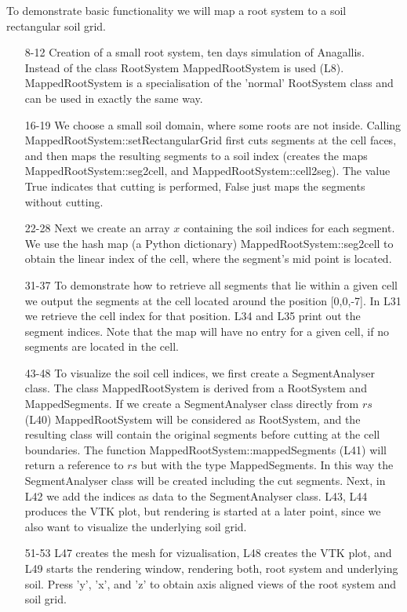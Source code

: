 To demonstrate basic functionality we will map a root system to a soil rectangular soil grid. 


\begin{itemize}

\item[8-12] Creation of a small root system, ten days simulation of Anagallis. Instead of the class RootSystem MappedRootSystem is used (L8). MappedRootSystem is a specialisation of the 'normal' RootSystem class and can be used in exactly the same way. 

\item[16-19] We choose a small soil domain, where some roots are not inside. Calling MappedRootSystem::setRectangularGrid first cuts segments at the cell faces, and then maps the resulting segments to a soil index (creates the maps MappedRootSystem::seg2cell, and MappedRootSystem::cell2seg). The value True indicates that cutting is performed, False just maps the segments without cutting. 

\item[22-28] Next we create an array $x$ containing the soil indices for each segment. We use the hash map (a Python dictionary) MappedRootSystem::seg2cell to obtain the linear index of the cell, where the segment's mid point is located.

\item[31-37] To demonstrate how to retrieve all segments that lie within a given cell we output the segments at the cell located around the position [0,0,-7]. In L31 we retrieve the cell index for that position. L34 and L35 print out the segment indices. Note that the map will have no entry for a given cell, if no segments are located in the cell. 

\item[43-48] To visualize the soil cell indices, we first create a SegmentAnalyser class. The class MappedRootSystem is derived from a RootSystem and MappedSegments. If we create a SegmentAnalyser class directly from $rs$ (L40) MappedRootSystem will be considered as RootSystem, and the resulting class will contain the original segments before cutting at the cell boundaries. The function MappedRootSystem::mappedSegments (L41) will return a reference to $rs$ but with the type MappedSegments. In this way the SegmentAnalyser class will be created including the cut segments. Next, in L42 we add the indices as data to the SegmentAnalyser class. L43, L44 produces the VTK plot, but rendering is started at a later point, since we also want to visualize the underlying soil grid.

\item[51-53]  L47 creates the mesh for vizualisation, L48 creates the VTK plot, and L49 starts the rendering window, rendering both, root system and underlying soil. Press 'y', 'x', and 'z' to obtain axis aligned views of the root system and soil grid.

\end{itemize}

